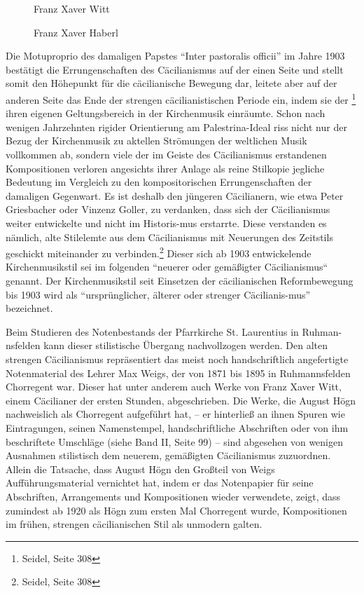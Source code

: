 \begin{figure}
\caption{Franz Xaver Witt}
\end{figure}

\begin{figure}
\caption{Franz Xaver Haberl}
\end{figure}

Die Motuproprio des damaligen Papstes “Inter pastoralis officii” im
Jahre 1903 bestätigt die Errungenschaften des Cäcilianismus auf der
einen Seite und stellt somit den Höhepunkt für die cäcilianische
Bewegung dar, leitete aber auf der anderen Seite das Ende der strengen
cäcilianistischen Periode ein, indem sie der  \footnote{Seidel, Seite 308} ihren eigenen Geltungsbereich in
der Kirchenmusik einräumte. Schon nach wenigen Jahrzehnten rigider
Orientierung am Palestrina-Ideal riss nicht nur der Bezug der
Kirchenmusik zu aktellen Strömungen der weltlichen Musik vollkommen ab,
sondern viele der im Geiste des Cäcilianismus erstandenen Kompositionen
verloren angesichts ihrer Anlage als reine Stilkopie jegliche Bedeutung
im Vergleich zu den kompositorischen Errungenschaften der damaligen
Gegenwart. Es ist deshalb den jüngeren Cäcilianern, wie etwa Peter
Griesbacher oder Vinzenz Goller, zu verdanken, dass sich der
Cäcilianismus weiter entwickelte und nicht im Historis-mus erstarrte.
Diese verstanden es nämlich, alte Stilelemte aus dem Cäcilianismus mit
Neuerungen des Zeitstils geschickt miteinander zu verbinden.\footnote{
Seidel, Seite 308} Dieser sich ab 1903 entwickelende Kirchenmusikstil
sei im folgenden “neuerer oder gemäßigter Cäcilianismus“ genannt. Der
Kirchenmusikstil seit Einsetzen der cäcilianischen Reformbewegung bis
1903 wird als “ursprünglicher, älterer oder strenger Cäcilianis-mus”
bezeichnet.

Beim Studieren des Notenbestands der Pfarrkirche St. Laurentius in
Ruhman-nsfelden kann dieser stilistische Übergang nachvollzogen werden.
Den alten strengen Cäcilianismus repräsentiert das meist noch
handschriftlich angefertigte Notenmaterial des Lehrer Max Weigs, der
von 1871 bis 1895 in Ruhmannsfelden Chorregent war. Dieser hat unter
anderem auch Werke von Franz Xaver Witt, einem Cäcilianer der ersten
Stunden, abgeschrieben. Die Werke, die August Högn nachweislich als
Chorregent aufgeführt hat, – er hinterließ an ihnen Spuren wie
Eintragungen, seinen Namenstempel, handschriftliche Abschriften oder
von ihm beschriftete Umschläge (siehe Band II, Seite 99) – sind
abgesehen von wenigen Ausnahmen stilistisch dem neuerem, gemäßigten
Cäcilianismus zuzuordnen. Allein die Tatsache, dass August Högn den
Großteil von Weigs Aufführungsmaterial vernichtet hat, indem er das
Notenpapier für seine Abschriften, Arrangements und Kompositionen
wieder verwendete, zeigt, dass zumindest ab 1920 als Högn zum ersten
Mal Chorregent wurde, Kompositionen im frühen, strengen cäcilianischen
Stil als unmodern galten.

